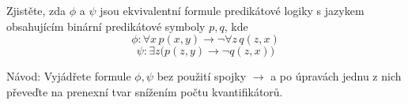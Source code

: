 Zjistěte, zda $\phi$ a $\psi$ jsou ekvivalentní formule predikátové logiky s jazykem obsahujícím binární predikátové symboly $p,q$, kde
$$\phi : \forall x\, p(x,y) \rightarrow \neg\forall z\, q(z,x)$$
$$\psi : \exists z \bigl(p(z,y) \rightarrow \neg q(z,x)\bigr)$$

Návod:
Vyjádřete formule $\phi,\psi$ bez použití spojky $\rightarrow$ a po úpravách jednu z nich převeďte na prenexní tvar snížením počtu kvantifikátorů.

